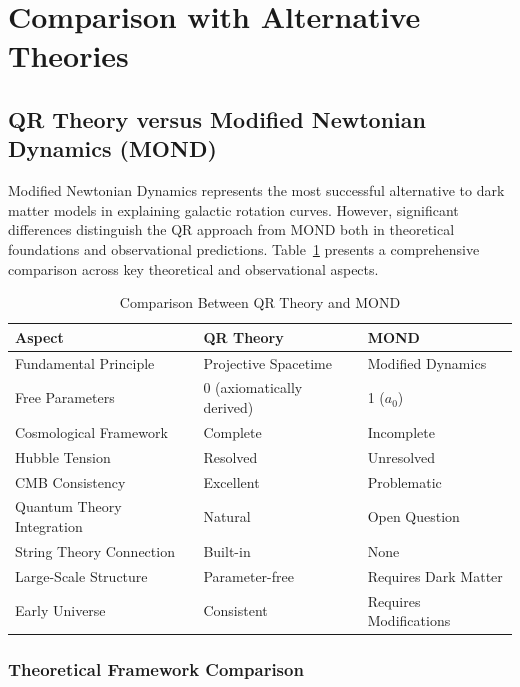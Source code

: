 \section{Comparison with Alternative Theories}
\label{sec:comparison-theories}

\subsection{QR Theory versus Modified Newtonian Dynamics (MOND)}
\label{subsec:qr-vs-mond}

Modified Newtonian Dynamics represents the most successful alternative to dark matter models in explaining galactic rotation curves. However, significant differences distinguish the QR approach from MOND both in theoretical foundations and observational predictions. Table~\ref{tab:qr-vs-mond} presents a comprehensive comparison across key theoretical and observational aspects.

\begin{table}[H]
\caption{Comparison Between QR Theory and MOND}
\label{tab:qr-vs-mond}
\centering
\begin{tabular}{@{}lll@{}}
\toprule
\textbf{Aspect} & \textbf{QR Theory} & \textbf{MOND} \\
\midrule
Fundamental Principle & Projective Spacetime & Modified Dynamics \\
Free Parameters & 0 (axiomatically derived) & 1 ($a_0$) \\
Cosmological Framework & Complete & Incomplete \\
Hubble Tension & Resolved & Unresolved \\
CMB Consistency & Excellent & Problematic \\
Quantum Theory Integration & Natural & Open Question \\
String Theory Connection & Built-in & None \\
Large-Scale Structure & Parameter-free & Requires Dark Matter \\
Early Universe & Consistent & Requires Modifications \\
\bottomrule
\end{tabular}
\end{table}

\subsubsection{Theoretical Framework Comparison}
\label{subsubsec:theoretical-framework-mond}


